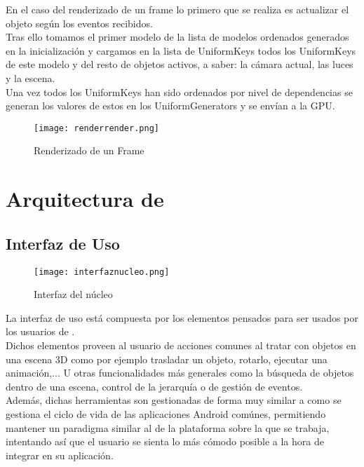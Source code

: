 En el caso del renderizado de un frame lo primero que se realiza es actualizar el objeto según los eventos recibidos.\\
Tras ello tomamos el primer modelo de la lista de modelos ordenados generados en la inicialización y cargamos en la lista de UniformKeys todos los UniformKeys de este modelo y del resto de objetos activos, a saber: la cámara actual, las luces y la escena.\\
Una vez todos los UniformKeys han sido ordenados por nivel de dependencias se generan los valores de estos en los UniformGenerators y se envían a la GPU.

\begin{figure}[h!]
\begin{center}
\texttt{[image: renderrender.png]}
\end{center}
\caption[Renderizado de un Frame]{Renderizado de un Frame}
\label{fig:renderrender}
\end{figure}




\section{Arquitectura de \robotto}

\subsection{Interfaz de Uso}

\begin{figure}[h!]
\begin{center}
\texttt{[image: interfaznucleo.png]}
\end{center}
\caption[Interfaz del núcleo]{Interfaz del núcleo}
\label{fig:interfaznucleo}
\end{figure}

La interfaz de uso está compuesta por los elementos pensados para ser usados por los usuarios de \robotto.\\
Dichos elementos proveen al usuario de acciones comunes al tratar con objetos en una escena 3D como por ejemplo trasladar un objeto, rotarlo, ejecutar una animación,... U otras funcionalidades más generales como la búsqueda de objetos dentro de una escena, control de la jerarquía o de gestión de eventos.\\
Además, dichas herramientas son gestionadas de forma muy similar a como se gestiona el ciclo de vida de las aplicaciones Android comúnes, permitiendo mantener un paradigma similar al de la plataforma sobre la que se trabaja, intentando así que el usuario se sienta lo más cómodo posible a la hora de integrar \robotto en su aplicación.\\

